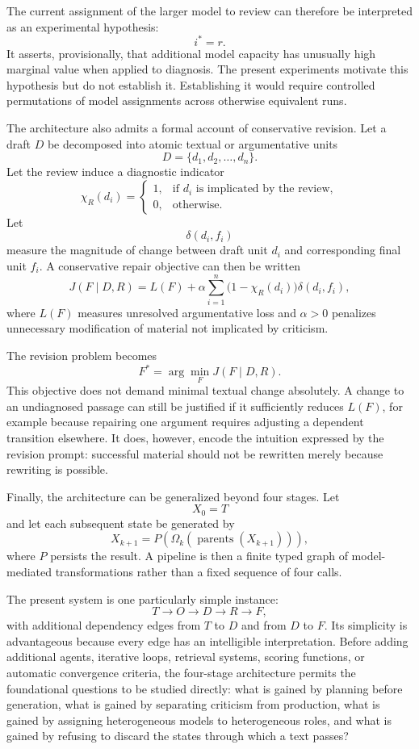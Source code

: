 \documentclass[11pt]{article}
\begin{document}
The current assignment of the larger model to review can therefore be interpreted as an experimental hypothesis:
\[
    i^\ast = r.
\]
It asserts, provisionally, that additional model capacity has unusually high marginal value when applied to diagnosis. The present experiments motivate this hypothesis but do not establish it. Establishing it would require controlled permutations of model assignments across otherwise equivalent runs.

The architecture also admits a formal account of conservative revision. Let a draft \(D\) be decomposed into atomic textual or argumentative units
\[
    D=\{d_1,d_2,\ldots,d_n\}.
\]
Let the review induce a diagnostic indicator
\[
    \chi_R(d_i)
    =
    \begin{cases}
    1, & \text{if }d_i\text{ is implicated by the review},\\
    0, & \text{otherwise}.
    \end{cases}
\]
Let
\[
    \delta(d_i,f_i)
\]
measure the magnitude of change between draft unit \(d_i\) and corresponding final unit \(f_i\). A conservative repair objective can then be written
\[
    J(F\mid D,R)
    =
    L(F)
    +
    \alpha
    \sum_{i=1}^{n}
    \bigl(1-\chi_R(d_i)\bigr)
    \delta(d_i,f_i),
\]
where \(L(F)\) measures unresolved argumentative loss and \(\alpha>0\) penalizes unnecessary modification of material not implicated by criticism.

The revision problem becomes
\[
    F^\ast
    =
    \arg\min_F J(F\mid D,R).
\]
This objective does not demand minimal textual change absolutely. A change to an undiagnosed passage can still be justified if it sufficiently reduces \(L(F)\), for example because repairing one argument requires adjusting a dependent transition elsewhere. It does, however, encode the intuition expressed by the revision prompt: successful material should not be rewritten merely because rewriting is possible.

Finally, the architecture can be generalized beyond four stages. Let
\[
    X_0=T
\]
and let each subsequent state be generated by
\[
    X_{k+1}
    =
    P\left(
        \Omega_k(
            \operatorname{parents}(X_{k+1})
        )
    \right),
\]
where \(P\) persists the result. A pipeline is then a finite typed graph of model-mediated transformations rather than a fixed sequence of four calls.

The present system is one particularly simple instance:
\[
    T
    \rightarrow
    O
    \rightarrow
    D
    \rightarrow
    R
    \rightarrow
    F,
\]
with additional dependency edges from \(T\) to \(D\) and from \(D\) to \(F\). Its simplicity is advantageous because every edge has an intelligible interpretation. Before adding additional agents, iterative loops, retrieval systems, scoring functions, or automatic convergence criteria, the four-stage architecture permits the foundational questions to be studied directly: what is gained by planning before generation, what is gained by separating criticism from production, what is gained by assigning heterogeneous models to heterogeneous roles, and what is gained by refusing to discard the states through which a text passes?
\end{document}
